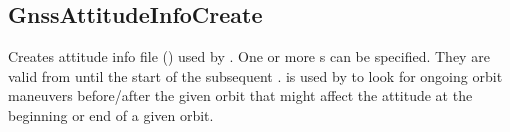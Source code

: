 \clearpage
\subsection{GnssAttitudeInfoCreate}\label{GnssAttitudeInfoCreate}
Creates attitude info file ()
used by . One or more s can be specified.
They are valid from  until the start of the subsequent .
 is used by  to look
for ongoing orbit maneuvers before/after the given orbit that might affect the attitude at
the beginning or end of a given orbit.


